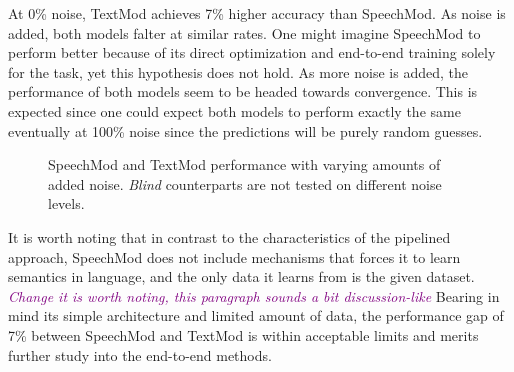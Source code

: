 \documentclass[letterpaper]{article} %
\newcommand{\tz}[1]{\textcolor{purple}{\textit{#1}}}
\begin{document}
At 0\% noise, TextMod achieves 7\% higher accuracy than SpeechMod. As noise is added, both models falter at similar rates. One might imagine SpeechMod to perform better because of its direct optimization and end-to-end training solely for the task, yet this hypothesis does not hold. As more noise is added, the performance of both models seem to be headed towards convergence. This is expected since one could expect both models to perform exactly the same eventually at 100\% noise since the predictions will be purely random guesses.

\pgfplotsset{width=8cm,compat=1.9}
\begin{figure}[t]
\centering
{}
\caption{SpeechMod and TextMod performance with varying amounts of added noise. \textit{Blind} counterparts are not tested on different noise levels.}
\label{fig:noiseplots}
\end{figure}


It is worth noting that in contrast to the characteristics of the pipelined approach, SpeechMod does not include mechanisms that forces it to learn semantics in language, and the only data it learns from is the given dataset. \tz{Change it is worth noting, this paragraph sounds a bit discussion-like} Bearing in mind its simple architecture and limited amount of data, the performance gap of 7\% between SpeechMod and TextMod is within acceptable limits and merits further study into the end-to-end methods.
\end{document}
